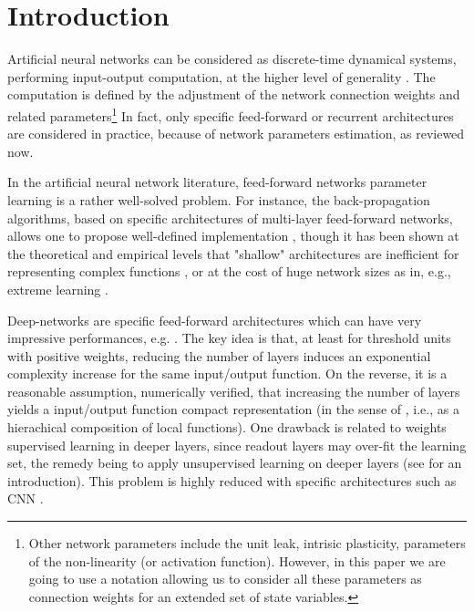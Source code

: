 \section{Introduction}

Artificial neural networks can be considered as discrete-time
dynamical systems, performing input-output computation, at the higher
level of generality \cite{siegelmann_turing_1991}. The computation is
defined by the adjustment of the network connection weights and
related parameters\footnote{Other network parameters include the unit
  leak, intrisic plasticity, parameters of the non-linearity (or
  activation function). However, in this paper we are going to use a
  notation allowing us to consider all these parameters as connection
  weights for an extended set of state variables.} In fact, only specific
feed-forward or recurrent architectures are considered in practice,
because of network parameters estimation, as reviewed now.

In the artificial neural network literature, feed-forward networks
parameter learning is a rather well-solved problem.  For instance, the
back-propagation algorithms, based on specific architectures of
multi-layer feed-forward networks, allows one to propose well-defined
implementation \cite{amit:89}, though it has been shown at the
theoretical and empirical levels that "shallow" architectures are
inefficient for representing complex functions \cite{Poggio2017,bengio-lecun:07},
or at the cost of huge network sizes as in, e.g., extreme learning
\cite{HUANG2006489}. 

Deep-networks are specific feed-forward architectures
\cite{bengio-lecun:07} which can have very impressive performances,
e.g.  \cite{farabet_learning_2013}. The key idea
\cite{hstad_power_1991} is that, at least for threshold units with
positive weights, reducing the number of layers induces an exponential
complexity increase for the same input/output function. On the
reverse, it is a reasonable assumption, numerically verified, that
increasing the number of layers yields a input/output function compact
representation (in the sense of \cite{hstad_power_1991}, i.e., as a
hierachical composition of local functions). One drawback is related
to weights supervised learning in deeper layers, since readout layers
may over-fit the learning set, the remedy being to apply unsupervised
learning on deeper layers (see \cite{Bengio:2009} for an
introduction). This problem is highly reduced with specific
architectures such as CNN \cite{Lecun1998Gradient}.


